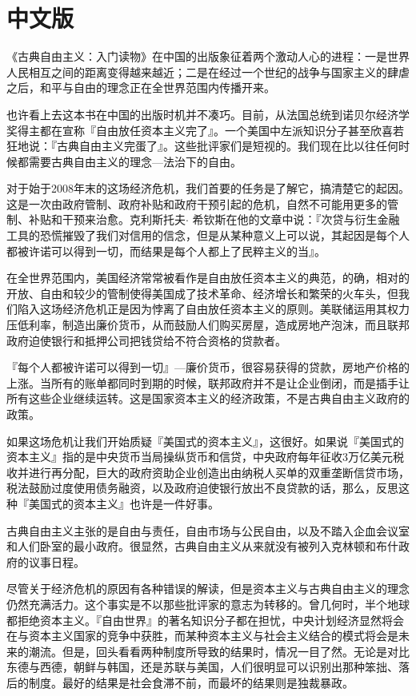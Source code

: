 \section*{中文版}
《古典自由主义：入门读物》在中国的出版象征着两个激动人心的进程：一是世界人民相互之间的距离变得越来越近；二是在经过一个世纪的战争与国家主义的肆虐之后，和平与自由的理念正在全世界范围内传播开来。

也许看上去这本书在中国的出版时机并不凑巧。目前，从法国总统到诺贝尔经济学奖得主都在宣称『自由放任资本主义完了』。一个美国中左派知识分子甚至欣喜若狂地说：『古典自由主义完蛋了』。这些批评家们是短视的。我们现在比以往任何时候都需要古典自由主义的理念---法治下的自由。

对于始于2008年末的这场经济危机，我们首要的任务是了解它，搞清楚它的起因。这是一次由政府管制、政府补贴和政府干预引起的危机，自然不可能用更多的管制、补贴和干预来治愈。克利斯托夫$\cdot$ 希钦斯在他的文章中说：『次贷与衍生金融工具的恐慌摧毁了我们对信用的信念，但是从某种意义上可以说，其起因是每个人都被许诺可以得到一切，而结果是每个人都上了民粹主义的当』。

在全世界范围内，美国经济常常被看作是自由放任资本主义的典范，的确，相对的开放、自由和较少的管制使得美国成了技术革命、经济增长和繁荣的火车头，但我们陷入这场经济危机正是因为悖离了自由放任资本主义的原则。美联储运用其权力压低利率，制造出廉价货币，从而鼓励人们购买房屋，造成房地产泡沫，而且联邦政府迫使银行和抵押公司把钱贷给不符合资格的贷款者。

『每个人都被许诺可以得到一切』---廉价货币，很容易获得的贷款，房地产价格的上涨。当所有的账单都同时到期的时候，联邦政府并不是让企业倒闭，而是插手让所有这些企业继续运转。这是国家资本主义的经济政策，不是古典自由主义政府的政策。

如果这场危机让我们开始质疑『美国式的资本主义』，这很好。如果说『美国式的资本主义』指的是中央货币当局操纵货币和信贷，中央政府每年征收3万亿美元税收并进行再分配，巨大的政府资助企业创造出由纳税人买单的双重垄断信贷市场，税法鼓励过度使用债务融资，以及政府迫使银行放出不良贷款的话，那么，反思这种『美国式的资本主义』也许是一件好事。

古典自由主义主张的是自由与责任，自由市场与公民自由，以及不踏入企血会议室和人们卧室的最小政府。很显然，古典自由主义从来就没有被列入克林顿和布什政府的议事日程。

尽管关于经济危机的原因有各种错误的解读，但是资本主义与古典自由主义的理念仍然充满活力。这个事实是不以那些批评家的意志为转移的。曾几何时，半个地球都拒绝资本主义。『自由世界』的著名知识分子都在担忧，中央计划经济显然将会在与资本主义国家的竞争中获胜，而某种资本主义与社会主义结合的模式将会是未来的潮流。但是，回头看看两种制度所导致的结果时，情况一目了然。无论是对比东德与西德，朝鲜与韩国，还是苏联与美国，人们很明显可以识别出那种笨拙、落后的制度。最好的结果是社会食滞不前，而最坏的结果则是独裁暴政。

